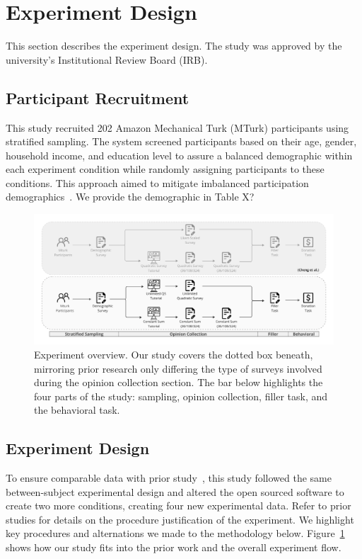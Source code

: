 \section{Experiment Design}
\label{sec:experiment}

This section describes the experiment design. The study was approved by the university's Institutional Review Board (IRB). 

\subsection{Participant Recruitment}
This study recruited 202 Amazon Mechanical Turk (MTurk) participants using stratified sampling. The system screened participants based on their age, gender, household income, and education level to assure a balanced demographic within each experiment condition while randomly assigning participants to these conditions. This approach aimed to mitigate imbalanced participation demographics~\cite{redmilesHowWellMy2019}. We provide the demographic in Table X?

\begin{figure}[t]
    \centering
    \includegraphics[width=\textwidth]{content/image/whyqs_exp_flow.pdf}
    \caption{Experiment overview. Our study covers the dotted box beneath, mirroring prior research only differing the type of surveys involved during the opinion collection section. The bar below highlights the four parts of the study: sampling, opinion collection, filler task, and the behavioral task.}
    \label{fig:experiment}
\end{figure}

\subsection{Experiment Design}
To ensure comparable data with prior study~\cite{chengCanShowWhat2021}, this study followed the same between-subject experimental design and altered the open sourced software to create two more conditions, creating four new experimental data. Refer to prior studies for details on the procedure justification of the experiment. We highlight key procedures and alternations we made to the methodology below. Figure~\ref{fig:experiment} shows how our study fits into the prior work and the overall experiment flow.

